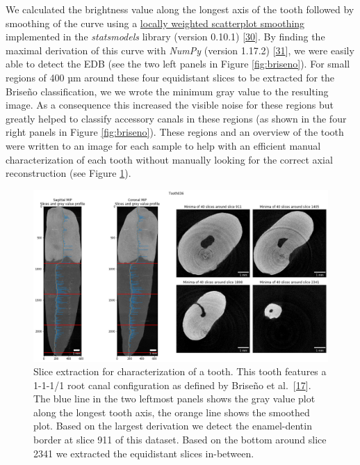 \documentclass[
  american,
]{article}
\begin{document}
We calculated the brightness value along the longest axis of the tooth followed by smoothing of the curve using a \href{https://www.statsmodels.org/devel/generated/statsmodels.nonparametric.smoothers_lowess.lowess.html}{locally weighted scatterplot smoothing} implemented in the \emph{statsmodels} library (version 0.10.1) {[}\protect\hyperlink{ref-E4OYV0qi}{30}{]}.
By finding the maximal derivation of this curve with \emph{NumPy} (version 1.17.2) {[}\protect\hyperlink{ref-OiM2HfsY}{31}{]}, we were easily able to detect the EDB (see the two left panels in Figure \ref{fig:briseno}).
For small regions of 400 µm around these four equidistant slices to be extracted for the Briseño classification, we we wrote the minimum gray value to the resulting image.
As a consequence this increased the visible noise for these regions but greatly helped to classify accessory canals in these regions (as shown in the four right panels in Figure \ref{fig:briseno}).
These regions and an overview of the tooth were written to an image for each sample to help with an efficient manual characterization of each tooth without manually looking for the correct axial reconstruction (see Figure \ref{fig:extractedslices}).

\begin{figure}
\hypertarget{fig:extractedslices}{%
\centering
\includegraphics{images/Tooth036.ExtractedSlices.png}
\caption{Slice extraction for characterization of a tooth.
This tooth features a 1-1-1/1 root canal configuration as defined by Briseño et al.~{[}\protect\hyperlink{ref-ZTgDEakx}{17}{]}.
The blue line in the two leftmost panels shows the gray value plot along the longest tooth axis, the orange line shows the smoothed plot.
Based on the largest derivation we detect the enamel-dentin border at slice 911 of this dataset.
Based on the bottom around slice 2341 we extracted the equidistant slices in-between.}\label{fig:extractedslices}
}
\end{figure}
\end{document}

